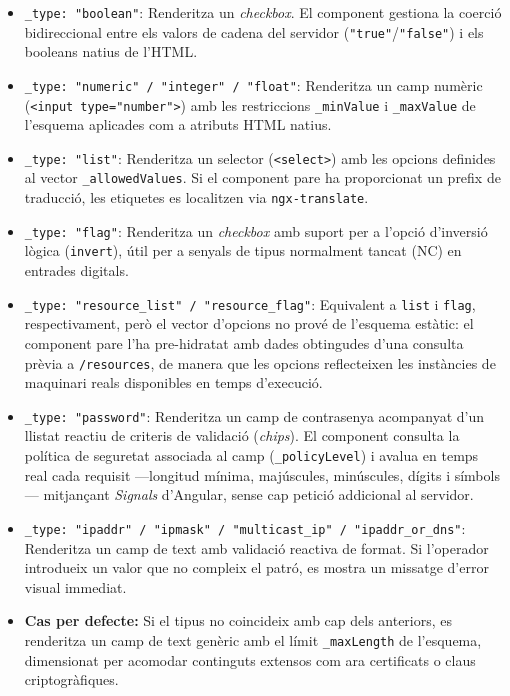 \begin{itemize}
  \item \texttt{\_type: "boolean"}: Renderitza un \textit{checkbox}. El component gestiona la coerció bidireccional entre els valors de cadena del servidor (\texttt{"true"}/\texttt{"false"}) i els booleans natius de l'HTML.
  \item \texttt{\_type: "numeric" / "integer" / "float"}: Renderitza un camp numèric (\texttt{<input type="number">}) amb les restriccions \texttt{\_minValue} i \texttt{\_maxValue} de l'esquema aplicades com a atributs HTML natius.
  \item \texttt{\_type: "list"}: Renderitza un selector (\texttt{<select>}) amb les opcions definides al vector \texttt{\_allowedValues}. Si el component pare ha proporcionat un prefix de traducció, les etiquetes es localitzen via \texttt{ngx-translate}.
  \item \texttt{\_type: "flag"}: Renderitza un \textit{checkbox} amb suport per a l'opció d'inversió lògica (\texttt{invert}), útil per a senyals de tipus normalment tancat (NC) en entrades digitals.
  \item \texttt{\_type: "resource\_list" / "resource\_flag"}: Equivalent a \texttt{list} i \texttt{flag}, respectivament, però el vector d'opcions no prové de l'esquema estàtic: el component pare l'ha pre-hidratat amb dades obtingudes d'una consulta prèvia a \texttt{/resources}, de manera que les opcions reflecteixen les instàncies de maquinari reals disponibles en temps d'execució.
  \item \texttt{\_type: "password"}: Renderitza un camp de contrasenya acompanyat d'un llistat reactiu de criteris de validació (\textit{chips}). El component consulta la política de seguretat associada al camp (\texttt{\_policyLevel}) i avalua en temps real cada requisit —longitud mínima, majúscules, minúscules, dígits i símbols— mitjançant \textit{Signals} d'Angular, sense cap petició addicional al servidor.
  \item \texttt{\_type: "ipaddr"\allowbreak{} / "ipmask"\allowbreak{} / "multicast\_ip"\allowbreak{} / "ipaddr\_or\_dns"}: Renderitza un camp de text amb validació reactiva de format. Si l'operador introdueix un valor que no compleix el patró, es mostra un missatge d'error visual immediat.
  \item \textbf{Cas per defecte:} Si el tipus no coincideix amb cap dels anteriors, es renderitza un camp de text genèric amb el límit \texttt{\_maxLength} de l'esquema, dimensionat per acomodar continguts extensos com ara certificats o claus criptogràfiques.
\end{itemize}

